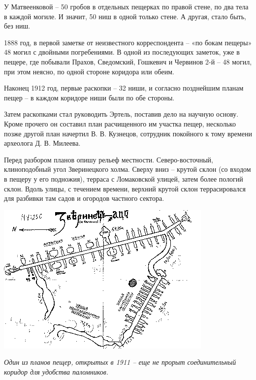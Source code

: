 У Матвеенковой – 50 гробов в отдельных пещерках по правой стене, по два тела в каждой могиле. И значит, 50 ниш в одной только стене. А другая, стало быть, без ниш.

1888 год, в первой заметке от неизвестного корреспондента – «по бокам пещеры» 48 могил с двойными погребениями. В одной из последующих заметок, уже в пещере, где побывали Прахов, Сведомский, Гошкевич и Червинов 2-й – 48 могил, при этом неясно, по одной стороне коридора или обеим.

Наконец 1912 год, первые раскопки – 32 ниши, и согласно позднейшим планам пещер – в каждом коридоре ниши были по обе стороны.

Затем раскопками стал руководить Эртель, поставив дело на научную основу. Кроме прочего он составил план расчищенного им участка пещер, несколько позже другой план начертил В. В. Кузнецов, сотрудник покойного к тому времени археолога Д. В. Милеева.

Перед разбором планов опишу рельеф местности. Северо-восточный, клиноподобный угол Зверинецкого холма. Сверху вниз – крутой склон (со входом в пещеру у его подножия), терраса с Ломаковской улицей, затем более пологий склон. Вдоль улицы, с течением времени, верхний крутой склон террасировался для разбивки там садов и огородов частного сектора.

\begin{center}
\includegraphics[width=0.90\linewidth]{chast-colebanie-osnov/nachalo/zverp-plan01.jpg}

\textit{Один из планов пещер, открытых в 1911 – еще не прорыт соединительный коридор для удобства паломников.}
\end{center}

\newpage
\vspace*{\fill}

